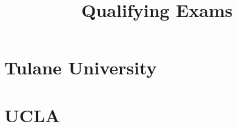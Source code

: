 \documentclass[]{article}
\title{Qualifying Exams}
\theoremstyle{plain}
\theoremstyle{plain}
\begin{document}
\linespread{1.2}
\maketitle
\section{Tulane University}










\section{UCLA}

































\end{document}
